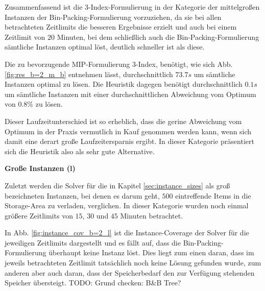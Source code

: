 Zusammenfassend ist die 3-Index-Formulierung in der Kategorie der mittelgroßen Instanzen der Bin-Packing-Formulierung vorzuziehen,
da sie bei allen betrachteten Zeitlimits die besseren Ergebnisse erzielt und auch bei einem Zeitlimit von $20$ Minuten, bei dem schließlich auch die Bin-Packing-Formulierung sämtliche Instanzen optimal löst, deutlich schneller ist als diese.

Die zu bevorzugende MIP-Formulierung 3-Index, benötigt, wie sich Abb. \ref{fig:res_b=2_m_b} entnehmen lässt, durchschnittlich
$73.7s$ um sämtliche Instanzen optimal zu lösen. Die Heuristik dagegen benötigt durchschnittlich $0.1s$ um sämtliche Instanzen
mit einer durchschnittlichen Abweichung vom Optimum von $0.8 \%$ zu lösen.

Dieser Laufzeitunterschied ist so erheblich, dass die gerine Abweichung vom Optimum in der Praxis vermutlich in Kauf genommen werden kann,
wenn sich damit eine derart große Laufzeitersparnis ergibt. In dieser Kategorie präsentiert sich die Heuristik also als sehr gute Alternative.

\textbf{Große Instanzen (l)}

Zuletzt werden die Solver für die in Kapitel \ref{sec:instance_sizes} als groß bezeichneten Instanzen, bei denen es darum geht,
$500$ eintreffende Items in die Storage-Area zu verladen, verglichen. In dieser Kategorie wurden noch einmal größere Zeitlimits von
$15$, $30$ und $45$ Minuten betrachtet.

In Abb. \ref{fig:instance_cov_b=2_l} ist die Instance-Coverage der Solver für die jeweiligen Zeitlimits dargestellt und es fällt auf,
dass die Bin-Packing-Formulierung überhaupt keine Instanz löst. Dies liegt zum einen daran, dass im jeweils betrachteten Zeitlimit
tatsächlich noch keine Lösung gefunden wurde, zum anderen aber auch daran, dass der Speicherbedarf den zur Verfügung stehenden Speicher
übersteigt. TODO: Grund checken: B\&B Tree?

